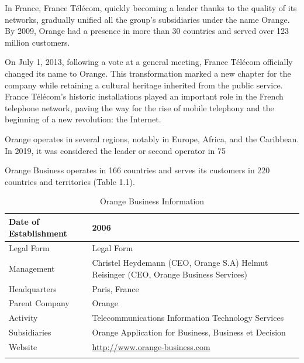 In France, France Télécom, quickly becoming a leader thanks to the quality of its networks, gradually unified all the group's subsidiaries under the name Orange. By 2009, Orange had a presence in more than 30 countries and served over 123 million customers.

On July 1, 2013, following a vote at a general meeting, France Télécom officially changed its name to Orange. This transformation marked a new chapter for the company while retaining a cultural heritage inherited from the public service. France Télécom's historic installations played an important role in the French telephone network, paving the way for the rise of mobile telephony and the beginning of a new revolution: the Internet.

Orange operates in several regions, notably in Europe, Africa, and the Caribbean. In 2019, it was considered the leader or second operator in 75%

Orange Business operates in 166 countries and serves its customers in 220 countries and territories (Table 1.1).
\begin{longtable}[c]{| m{4.4cm} | m{11cm} |}
          \hline
          Date of Establishment & 2006 \\
          \hline
          Legal Form & Legal Form \\
          \hline
          Management & Christel Heydemann (CEO, Orange S.A)
          Helmut Reisinger (CEO, Orange Business Services) \\
          \hline
          Headquarters & Paris, France \\
          \hline
          Parent Company & Orange \\
          \hline
          Activity & Telecommunications
          Information Technology Services \\
          \hline
          Subsidiaries & Orange Application for Business, Business et Decision \\
          \hline
          Website & \url{http://www.orange-business.com} \\
          \hline
          \caption{Orange Business Information}\\
\end{longtable}


